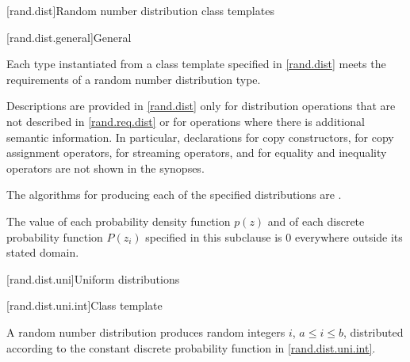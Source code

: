 



[rand.dist]{Random number distribution class templates}%

[rand.dist.general]{General}

\pnum
Each type instantiated
from a class template specified in \ref{rand.dist}
meets the requirements
of a random number distribution type.

\pnum
Descriptions are provided in \ref{rand.dist}
only for distribution operations
that are not described in \ref{rand.req.dist}
or for operations where there is additional semantic information.
In particular,
declarations for copy constructors,
for copy assignment operators,
for streaming operators,
and for equality and inequality operators
are not shown in the synopses.

\pnum
The algorithms for producing each
of the specified distributions are
.

\pnum
The value of each probability density function $p(z)$
and of each discrete probability function $P(z_i)$
specified in this subclause
is $0$
everywhere outside its stated domain.


[rand.dist.uni]{Uniform distributions}%
%


[rand.dist.uni.int]{Class template }%
%

\pnum
A  random number distribution
produces random integers $i$,
$a \leq i \leq b$,
distributed according to
the constant discrete probability function in \eqref{rand.dist.uni.int}.

